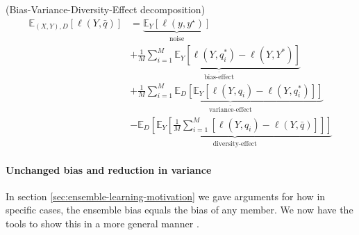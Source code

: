 \documentclass[../main.tex]{subfiles}
\begin{document}
\begin{theorem} (Bias-Variance-Diversity-Effect decomposition)
\begin{align*}
    \mathbb{E}_{(X,Y),D}\left[ \ell(Y, \bar{q}) \right] &= 
    \underbrace{ \mathbb{E}_{Y}\left[ \ell(y, y^\star) \right] }_{\text{noise}} \\
    &+
    \underbrace{
        \frac{1}{M} \sum_{i=1}^M \mathbb{E}_Y\left[\ell\left(Y, q_i^*\right)-\ell\left(Y, Y^*\right)\right]
    }_{\overline{\text{bias-effect}}} \\
    &+
    \underbrace{
        \frac{1}{M} \sum_{i=1}^M \mathbb{E}_D\left[\mathbb{E}_Y\left[\ell\left(Y, q_i\right)-\ell\left(Y, q_i^*\right)\right]\right]
    }_{\overline{\text{variance-effect}}} \\
    &- %
    \underbrace{
    \mathbb{E}_D\left[\mathbb{E}_Y\left[\frac{1}{M} \sum_{i=1}^M\left[\ell\left(Y, q_i\right)-\ell(Y, \bar{q})\right]\right]\right]
    }_{\text{diversity-effect}}
\end{align*}
\end{theorem}

\paragraph{Unchanged bias and reduction in variance}
\label{sec:unchanged-bias}

In section \ref{sec:ensemble-learning-motivation} we gave arguments for how in specific cases, the ensemble bias equals the bias of any member. We now have the tools to show this in a more general manner \cite{wood23}.
\end{document}
